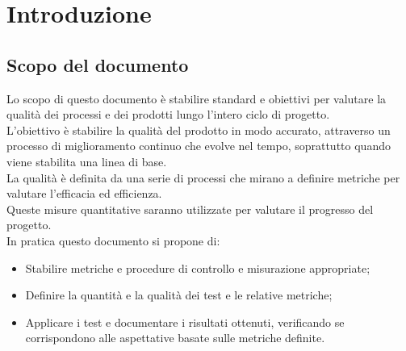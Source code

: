 
\section{Introduzione}
\subsection{Scopo del documento}
Lo scopo di questo documento è stabilire standard e obiettivi per valutare la qualità
dei processi e dei prodotti lungo l'intero ciclo di progetto. \\
L'obiettivo è stabilire la qualità del prodotto in modo accurato, attraverso un processo di miglioramento continuo che evolve nel tempo, soprattutto quando viene stabilita
una linea di base. \\
La qualità è definita da una serie di processi che mirano a definire metriche per valutare
l'efficacia ed efficienza. \\
Queste misure quantitative saranno utilizzate per valutare il progresso del progetto.\\
In pratica questo documento si propone di:
\begin{itemize}
    \item Stabilire metriche e procedure di controllo e misurazione appropriate;
    \item Definire la quantità e la qualità dei test e le relative metriche;
    \item Applicare i test e documentare i risultati ottenuti, verificando se corrispondono alle aspettative basate sulle metriche definite.
\end{itemize}

